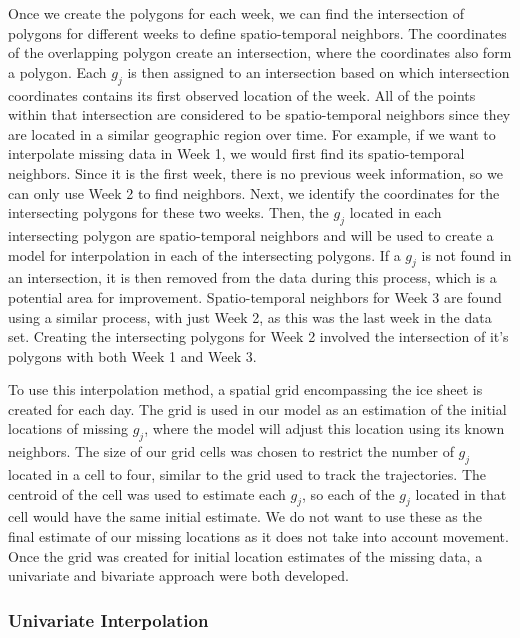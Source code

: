 \documentclass[12pt]{article}
\begin{document}
Once we create the polygons for each week, we can find the intersection
of polygons for different weeks to define spatio-temporal neighbors. The
coordinates of the overlapping polygon create an intersection, where the
coordinates also form a polygon. Each \(g_j\) is then assigned to an
intersection based on which intersection coordinates contains its first
observed location of the week. All of the points within that
intersection are considered to be spatio-temporal neighbors since they
are located in a similar geographic region over time. For example, if we
want to interpolate missing data in Week 1, we would first find its
spatio-temporal neighbors. Since it is the first week, there is no
previous week information, so we can only use Week 2 to find neighbors.
Next, we identify the coordinates for the intersecting polygons for
these two weeks. Then, the \(g_j\) located in each intersecting polygon
are spatio-temporal neighbors and will be used to create a model for
interpolation in each of the intersecting polygons. If a \(g_j\) is not
found in an intersection, it is then removed from the data during this
process, which is a potential area for improvement. Spatio-temporal
neighbors for Week 3 are found using a similar process, with just Week
2, as this was the last week in the data set. Creating the intersecting
polygons for Week 2 involved the intersection of it's polygons with both
Week 1 and Week 3.

To use this interpolation method, a spatial grid encompassing the ice
sheet is created for each day. The grid is used in our model as an
estimation of the initial locations of missing \(g_j\), where the model
will adjust this location using its known neighbors. The size of our
grid cells was chosen to restrict the number of \(g_j\) located in a
cell to four, similar to the grid used to track the trajectories. The
centroid of the cell was used to estimate each \(g_j\), so each of the
\(g_j\) located in that cell would have the same initial estimate. We do
not want to use these as the final estimate of our missing locations as
it does not take into account movement. Once the grid was created for
initial location estimates of the missing data, a univariate and
bivariate approach were both developed.

\hypertarget{univariate-interpolation}{%
\subsubsection{Univariate
Interpolation}\label{univariate-interpolation}}
\end{document}
